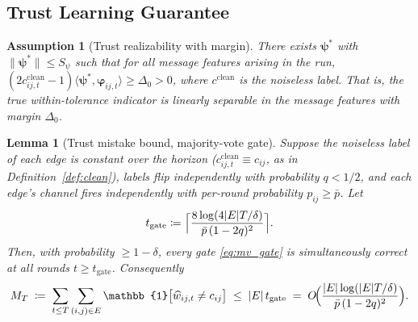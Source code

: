 \documentclass[11pt]{article}
\newtheorem{lemma}[theorem]{Lemma}
\newtheorem{assumption}[theorem]{Assumption}
\begin{document}
\subsection{Trust Learning Guarantee}

\begin{assumption}[Trust realizability with margin]\label{ass:realizable}
There exists $\bm{\psi}^{\!*}$ with $\|\bm{\psi}^{\!*}\|\leq S_\psi$
such that for all message features arising in the run,
$(2c^{\mathrm{clean}}_{ij,t}-1)\langle\bm{\psi}^{\!*},\bm{\varphi}_{ij,t}\rangle
\geq\Delta_0>0$, where $c^{\mathrm{clean}}$ is the noiseless label.
That is, the true within-tolerance indicator is linearly separable in
the message features with margin $\Delta_0$.
\end{assumption}

\begin{lemma}[Trust mistake bound, majority-vote gate]\label{lem:trust_mistakes}
Suppose the noiseless label of each edge is constant over the horizon
($c^{\mathrm{clean}}_{ij,t}\equiv c_{ij}$, as in
Definition~\ref{def:clean}), labels flip independently with
probability $q<1/2$, and each edge's channel fires independently with
per-round probability $p_{ij}\geq\bar p$.  Let
\begin{equation}
t_{\mathrm{gate}}\coloneqq
\Bigl\lceil\frac{8\log(4|E|T/\delta)}{\bar p\,(1-2q)^2}\Bigr\rceil .
\label{eq:tgate}
\end{equation}
Then, with probability $\geq 1-\delta$, \emph{every} gate
\eqref{eq:mv_gate} is simultaneously correct at \emph{all} rounds
$t\geq t_{\mathrm{gate}}$. Consequently
\begin{equation}
M_T\;\coloneqq\;\sum_{t\leq T}\sum_{(i,j)\in E}
\mathbb{1}\bigl[\widehat w_{ij,t}\neq c_{ij}\bigr]
\;\leq\;|E|\,t_{\mathrm{gate}}
\;=\;O\!\Bigl(\frac{|E|\log(|E|T/\delta)}{\bar p\,(1-2q)^2}\Bigr).
\label{eq:mistake_bound}
\end{equation}
\end{lemma}
\end{document}
